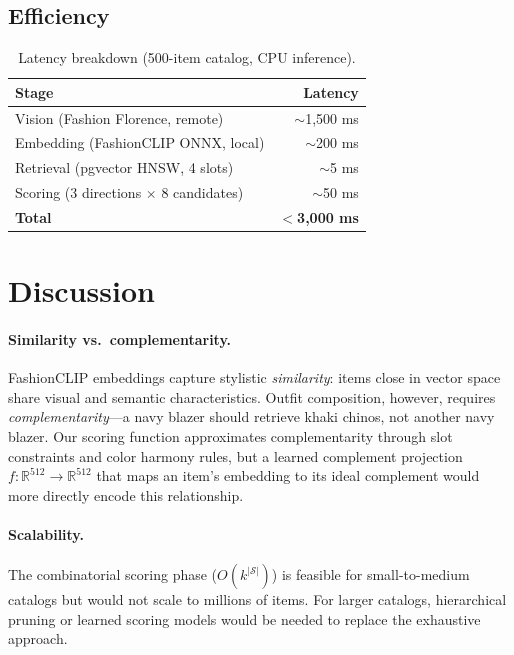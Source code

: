 \documentclass[10pt,twocolumn]{article}
\begin{document}
\subsection{Efficiency}

\begin{table}[h]
\centering
\small
\caption{Latency breakdown (500-item catalog, CPU inference).}
\label{tab:latency}
\begin{tabular}{lr}
\toprule
Stage & Latency \\
\midrule
Vision (Fashion Florence, remote) & $\sim$1{,}500 ms \\
Embedding (FashionCLIP ONNX, local) & $\sim$200 ms \\
Retrieval (pgvector HNSW, 4 slots) & $\sim$5 ms \\
Scoring (3 directions $\times$ 8 candidates) & $\sim$50 ms \\
\midrule
\textbf{Total} & $<$\textbf{3{,}000 ms} \\
\bottomrule
\end{tabular}
\end{table}

\section{Discussion}
\label{sec:discussion}

\paragraph{Similarity vs.\ complementarity.}
FashionCLIP embeddings capture stylistic \emph{similarity}: items close in
vector space share visual and semantic characteristics.  Outfit composition,
however, requires \emph{complementarity}---a navy blazer should retrieve
khaki chinos, not another navy blazer.  Our scoring function approximates
complementarity through slot constraints and color harmony rules, but a
learned complement projection $f: \mathbb{R}^{512} \to \mathbb{R}^{512}$
that maps an item's embedding to its ideal complement would more directly
encode this relationship.

\paragraph{Scalability.}
The combinatorial scoring phase ($O(k^{|\mathcal{S}|})$) is feasible for
small-to-medium catalogs but would not scale to millions of items.  For
larger catalogs, hierarchical pruning or learned scoring models would be
needed to replace the exhaustive approach.
\end{document}
